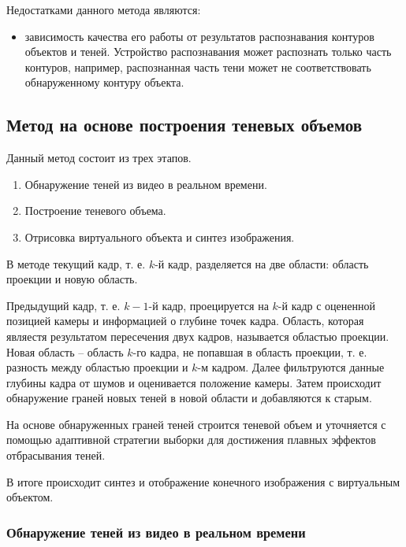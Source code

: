 Недостатками данного метода являются:

\begin{itemize}
	\item зависимость качества его работы от результатов распознавания контуров объектов и теней. Устройство распознавания может распознать только часть контуров, например, распознанная часть тени может не соответствовать обнаруженному контуру объекта.
\end{itemize}

\subsection{Метод на основе построения теневых объемов}

Данный метод состоит из трех этапов.

\begin{enumerate}
	\item Обнаружение теней из видео в реальном времени.
	\item Построение теневого объема.
	\item Отрисовка виртуального объекта и синтез изображения.
\end{enumerate}

В методе текущий кадр, т. е. $k$-й кадр, разделяется на две области: область проекции и новую область. 

Предыдущий кадр, т. е. $k-1$-й кадр, проецируется на $k$-й кадр с оцененной позицией камеры и информацией о глубине точек кадра. Область, которая являестя результатом пересечения двух кадров, называется областью проекции. Новая область -- область $k$-го кадра, не попавшая в область проекции, т. е. разность между областью проекции и $k$-м кадром. Далее фильтруются данные глубины кадра от шумов и оценивается положение камеры. Затем происходит обнаружение граней новых теней в новой области и добавляются к старым. 

На основе обнаруженных граней теней строится теневой объем и уточняется с помощью адаптивной стратегии выборки \cite{THOMASIAN2022385} для достижения плавных эффектов отбрасывания теней.

В итоге происходит синтез и отображение конечного изображения с виртуальным объектом.

\subsubsection*{Обнаружение теней из видео в реальном времени}

